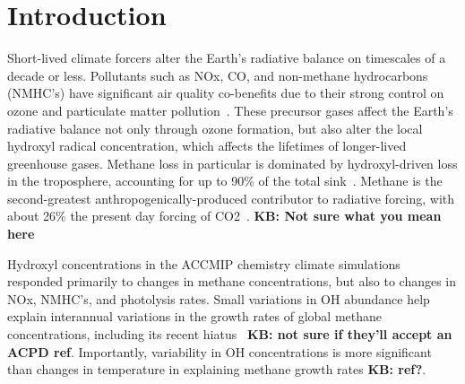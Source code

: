 \section{Introduction}



Short-lived climate forcers alter the Earth's radiative balance on timescales of a decade or less. Pollutants such as NOx, CO, and non-methane hydrocarbons (NMHC's) have significant air quality co-benefits due to their strong control on ozone and particulate matter pollution~\citep{ref:driscoll2015}. These precursor gases affect the Earth's radiative balance not only through ozone formation, but also alter the local hydroxyl radical concentration, which affects the lifetimes of longer-lived greenhouse gases. Methane loss in particular is dominated by hydroxyl-driven loss in the troposphere, accounting for up to 90\% of the total sink~\citep{ref:kirschke2013}. Methane is the second-greatest anthropogenically-produced contributor to radiative forcing, with about 26\% the present day forcing of CO2~\citep{ref:myhre2013}. \textbf{KB: Not sure what you mean here}


Hydroxyl concentrations in the ACCMIP chemistry climate simulations~\citep{ref:voulgarakis2013} responded primarily to changes in methane concentrations, but also to changes in NOx, NMHC's, and photolysis rates. Small variations in OH abundance help explain interannual variations in the growth rates of global methane concentrations, including its recent hiatus~\citep{ref:mcnorton2016} \textbf{KB: not sure if they'll accept an ACPD ref}. Importantly, variability in OH concentrations is more significant than changes in temperature in explaining methane growth rates \textbf{KB: ref?}.


